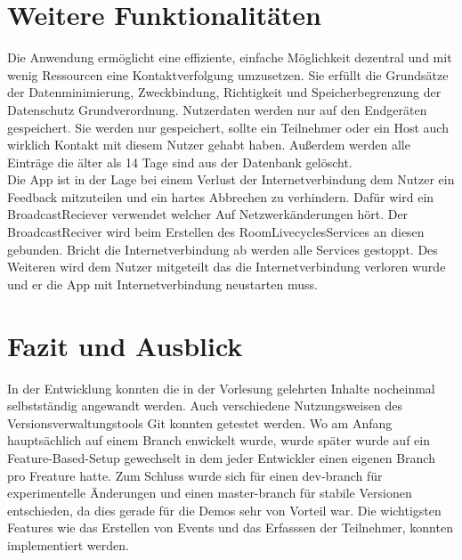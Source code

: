 \section{Weitere Funktionalitäten}
\label{sec:sonstiges}
Die Anwendung ermöglicht eine effiziente, einfache Möglichkeit dezentral und mit wenig Ressourcen eine Kontaktverfolgung umzusetzen.
Sie erfüllt die Grundsätze der Datenminimierung, Zweckbindung, Richtigkeit und Speicherbegrenzung der Datenschutz Grundverordnung. Nutzerdaten werden nur auf den Endgeräten gespeichert. 
Sie werden nur gespeichert, sollte ein Teilnehmer oder ein Host auch wirklich Kontakt mit diesem Nutzer gehabt haben. 
Außerdem werden alle Einträge die älter als 14 Tage sind aus der Datenbank gelöscht.\\
Die App ist in der Lage bei einem Verlust der Internetverbindung dem Nutzer ein Feedback mitzuteilen und ein hartes Abbrechen zu verhindern. 
Dafür wird ein BroadcastReciever verwendet welcher Auf Netzwerkänderungen hört. 
Der BroadcastReciver wird beim Erstellen des RoomLivecyclesServices an diesen gebunden.
 Bricht die Internetverbindung ab werden alle Services gestoppt. 
Des Weiteren wird dem Nutzer mitgeteilt das die Internetverbindung verloren wurde und er die App mit Internetverbindung neustarten muss.

\section{Fazit und Ausblick}
\label{sec:FuA}
In der Entwicklung konnten die in der Vorlesung gelehrten Inhalte nocheinmal selbstständig angewandt werden. 
Auch verschiedene Nutzungsweisen des Versionsverwaltungstools Git konnten getestet werden. 
Wo am Anfang hauptsächlich auf einem Branch enwickelt wurde, wurde später wurde auf ein Feature-Based-Setup gewechselt in dem jeder Entwickler einen eigenen Branch pro Freature hatte.
Zum Schluss wurde sich für einen dev-branch für experimentelle Änderungen und einen master-branch für stabile Versionen entschieden, da dies gerade für die Demos sehr von Vorteil war. 
Die wichtigsten Features wie das Erstellen von Events und das Erfasssen der Teilnehmer, konnten implementiert werden.

